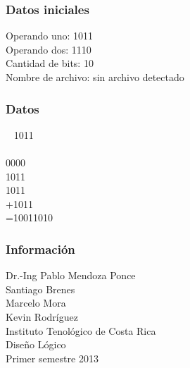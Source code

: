 \documentclass{beamer}
\begin{document}
\begin{frame}\frametitle{Datos iniciales}Operando uno: 1011\\Operando dos: 1110\\Cantidad de bits: 10\\Nombre de archivo: sin archivo detectado\end{frame}
\begin{frame}\frametitle{Datos}\,\,\,\,\,1011\\\\0000\\1011\\1011\\+1011\\=10011010\end{frame}
\begin{frame}\frametitle{Informaci\'on}Dr.-Ing Pablo Mendoza Ponce \\ Santiago Brenes \\ Marcelo Mora \\ Kevin Rodr\'iguez \\ Instituto Tenol\'ogico de Costa Rica \\ Dise\~{n}o L\'ogico \\ Primer semestre 2013\end{frame}
\end{document}
